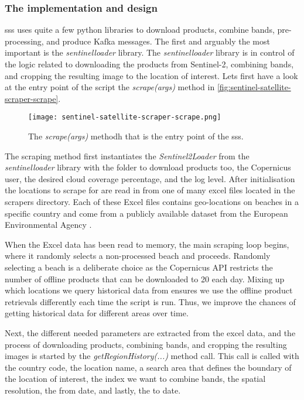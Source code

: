 \subsubsection{The implementation and design}

\acrshort{sss} uses quite a few python libraries to download products, combine bands, pre-processing, and produce Kafka messages. The first and arguably the most important is the \emph{sentinelloader} library. The \emph{sentinelloader} library is in control of the logic related to downloading the products from Sentinel-2, combining bands, and cropping the resulting image to the location of interest. Lets first have a look at the entry point of the script the \emph{scrape(args)} method in \autoref{fig:sentinel-satellite-scraper-scrape}.

\begin{figure}[h!]
    \centering
    \texttt{[image: sentinel-satellite-scraper-scrape.png]}
    \caption{The \emph{scrape(args)} methodh that is the entry point of the \acrshort{sss}.}
    \label{fig:sentinel-satellite-scraper-scrape}
\end{figure}

The scraping method first instantiates the \emph{Sentinel2Loader} from the \emph{sentinelloader} library with the folder to download products too, the Copernicus user, the desired cloud coverage percentage, and the log level. After initialisation the locations to scrape for are read in from one of many excel files located in the scrapers directory. Each of these Excel files contains geo-locations on beaches in a specific country and come from a publicly available dataset from the European Environmental Agency \cite{bathing_dateset}. 

When the Excel data has been read to memory, the main scraping loop begins, where it randomly selects a non-processed beach and proceeds. Randomly selecting a beach is a deliberate choice as the Copernicus API restricts the number of offline products that can be downloaded to 20 each day. Mixing up which locations we query historical data from ensures we use the offline product retrievals differently each time the script is run. Thus, we improve the chances of getting historical data for different areas over time.

Next, the different needed parameters are extracted from the excel data, and the process of downloading products, combining bands, and cropping the resulting images is started by the \emph{getRegionHistory(...)} method call. This call is called with the country code, the location name, a search area that defines the boundary of the location of interest, the index we want to combine bands, the spatial resolution, the from date, and lastly, the to date.

